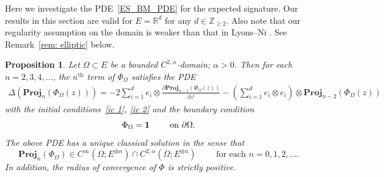 \documentclass[11pt,a4paper,english,reqno]{amsart}
\theoremstyle{plain}
\newtheorem{proposition}[definition]{Proposition}
\newcommand{\R}{\mathbb{R}}
\newcommand{\p}{\partial}
\newcommand{\1}{\mathbbm{1}}
\newcommand{\proj}{\mathbf{Proj}}
\begin{document}
Here we investigate the PDE~\eqref{ES_BM_PDE} for the expected signature. Our results in this section are valid for $E=\R^d$ for any $d\in \mathbb{Z}_{\geq 2}$. Also note that our regularity assumption on the domain is weaker than that in Lyons--Ni \cite{lyons2015expected}. See Remark~\ref{rem: elliptic} below.


\begin{proposition}\label{prop: schauder}
Let $\Omega \subset E$ be a bounded $C^{2,\alpha}$-domain; $\alpha > 0$. Then for each $n = 2,3,4,\ldots$, the $n^{\text{th}}$ term of $\Phi_{\Omega}$ satisfies the PDE
\begin{align}
  \Delta\left(\proj_{n}(\Phi_{\Omega}(z))\right)
=  -2\sum_{i=1}^{d}e_{i}\otimes\frac{\partial\proj_{n-1}(\Phi_{\Omega }(z))}{\partial z^{i}} -\left(\sum_{i=1}^{d}e_{i}\otimes e_{i}\right)\otimes\proj_{n-2}(\Phi_{\Omega }(z))\label{eq:LyonsNiPDE}
\end{align}
with the initial conditions~\eqref{ic 1}, \eqref{ic 2} and the boundary condition
\begin{equation}\label{bc, Holder domain}
    \Phi_{\Omega} = {\bf 1} \qquad\text{ on } \p \Omega. 
\end{equation}
The above PDE has a unique classical solution in the sense that
\begin{equation*}
    \proj_{n}(\Phi_{\Omega}) \in C^\infty\left(\Omega; E^{\otimes n}\right) \cap C^{2,\alpha}\left(\overline{\Omega}; E^{\otimes n}\right) \qquad \text{ for each } n=0,1,2,\ldots.
\end{equation*}
In addition, the radius of convergence of $\Phi$ is strictly positive. 
\end{proposition}



\end{document}

